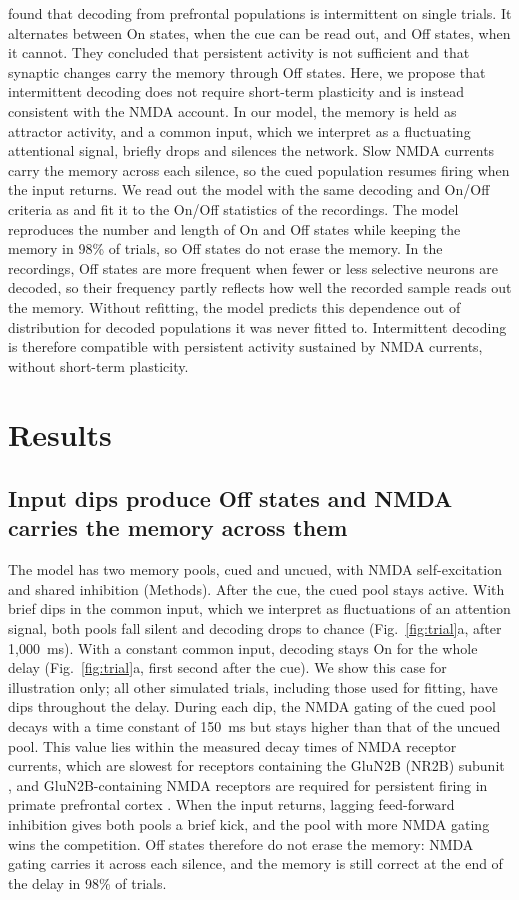 \documentclass[11pt]{article}
\begin{document}
\citet{panichello2024} found that decoding from prefrontal populations is intermittent on single trials.
It alternates between On states, when the cue can be read out, and Off states, when it cannot.
They concluded that persistent activity is not sufficient and that synaptic changes carry the memory through Off states.
Here, we propose that intermittent decoding does not require short-term plasticity and is instead consistent with the NMDA account.
In our model, the memory is held as attractor activity, and a common input, which we interpret as a fluctuating attentional signal, briefly drops and silences the network.
Slow NMDA currents carry the memory across each silence, so the cued population resumes firing when the input returns.
We read out the model with the same decoding and On/Off criteria as \citet{panichello2024} and fit it to the On/Off statistics of the recordings.
The model reproduces the number and length of On and Off states while keeping the memory in 98\% of trials, so Off states do not erase the memory.
In the recordings, Off states are more frequent when fewer or less selective neurons are decoded, so their frequency partly reflects how well the recorded sample reads out the memory.
Without refitting, the model predicts this dependence out of distribution for decoded populations it was never fitted to.
Intermittent decoding is therefore compatible with persistent activity sustained by NMDA currents, without short-term plasticity.

\section{Results}

\subsection{Input dips produce Off states and NMDA carries the memory across them}

The model has two memory pools, cued and uncued, with NMDA self-excitation and shared inhibition (Methods).
After the cue, the cued pool stays active.
With brief dips in the common input, which we interpret as fluctuations of an attention signal, both pools fall silent and decoding drops to chance (Fig.~\ref{fig:trial}a, after 1,000~ms).
With a constant common input, decoding stays On for the whole delay (Fig.~\ref{fig:trial}a, first second after the cue).
We show this case for illustration only; all other simulated trials, including those used for fitting, have dips throughout the delay.
During each dip, the NMDA gating of the cued pool decays with a time constant of 150~ms but stays higher than that of the uncued pool.
This value lies within the measured decay times of NMDA receptor currents, which are slowest for receptors containing the GluN2B (NR2B) subunit \citep{vicini1998}, and GluN2B-containing NMDA receptors are required for persistent firing in primate prefrontal cortex \citep{wangm2013}.
When the input returns, lagging feed-forward inhibition gives both pools a brief kick, and the pool with more NMDA gating wins the competition.
Off states therefore do not erase the memory: NMDA gating carries it across each silence, and the memory is still correct at the end of the delay in 98\% of trials.
\end{document}
